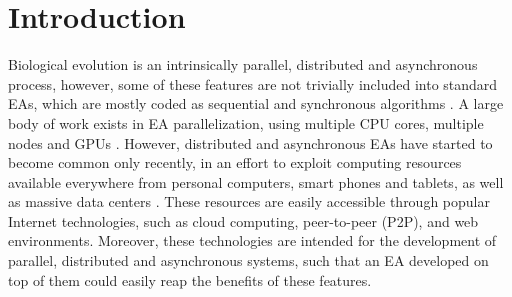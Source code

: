 \documentclass[graybox]{svmult}
\begin{document}
\section{Introduction}

Biological evolution is an intrinsically parallel, distributed and asynchronous process, however,
some of these features are not trivially included into standard EAs,  which are mostly coded as sequential
and synchronous algorithms \cite{eiben}.  A large body of work exists in EA parallelization,
using multiple CPU cores, multiple nodes and GPUs \cite{cantu2000efficient,hofmann2013performance}.
However, distributed and asynchronous EAs have started to become common only recently,
in an effort to exploit computing resources available everywhere from personal computers,
smart phones and tablets, as well as massive data centers \cite{agajaj,FlexGP}.
These resources are easily accessible through popular Internet technologies, such as cloud computing,
peer-to-peer (P2P), and web environments. Moreover, these technologies are intended for the development
of parallel, distributed and asynchronous systems, such that an EA developed on top of them could easily
reap the benefits of these features.
\end{document}
